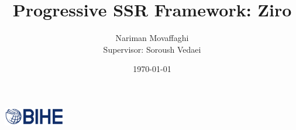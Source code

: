 \documentclass{article}
\author{Nariman Movaffaghi \\[0.4em]
Supervisor: Soroush Vedaei}
\title{Progressive SSR Framework: Ziro}
\date{\small \today}
\begin{document}
\maketitle

\begin{center}
    \vspace{0em}
    \includegraphics[width=0.2\textwidth]{bihe-logo.png} \\[1em]
\end{center}


\pagebreak

\tableofcontents
\pagebreak









\end{document}
